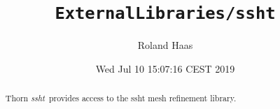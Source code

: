 \documentclass{article}
\begin{document}
\title{\tt ExternalLibraries/ssht}
\author{Roland Haas}
\date{ Wed Jul 10 15:07:16 CEST 2019 }

\maketitle


\ifx\ThisThorn\undefined
\newcommand{\ThisThorn}{{\it ssht}}
\else
\renewcommand{\ThisThorn}{{\it ssht}}
\fi

\begin{abstract}
Thorn \ThisThorn\ provides access to the ssht mesh refinement library.
\end{abstract}

\end{document}
